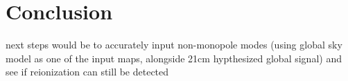 \chapter{Conclusion}

next steps would be to accurately input non-monopole modes (using global sky 
model as one of the input maps, alongside 21cm hypthesized global signal) and 
see if reionization can still be detected

